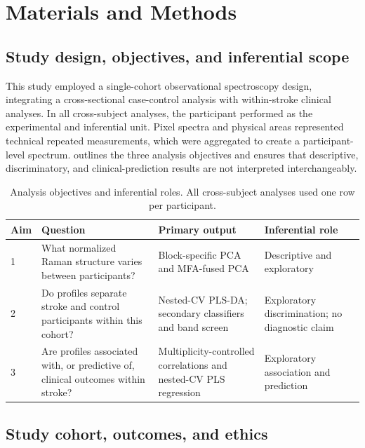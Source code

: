 \documentclass[preprint,12pt]{elsarticle}
\begin{document}
\section{Materials and Methods} 
\label{sec:methods}

\subsection{Study design, objectives, and inferential scope} \label{subsec:design}

This study employed a single-cohort observational spectroscopy design, integrating a cross-sectional case-control analysis with within-stroke clinical analyses. In all cross-subject analyses, the participant performed as the experimental and inferential unit. Pixel spectra and physical areas represented technical repeated measurements, which were aggregated to create a participant-level spectrum.  outlines the three analysis objectives and ensures that descriptive, discriminatory, and clinical-prediction results are not interpreted interchangeably.

\begin{table}[htbp] 
\centering 
\caption{Analysis objectives and inferential roles. All cross-subject analyses used one row per participant.} 
\label{tab:analysis_objectives} 
\small 
\begin{tabularx}{\textwidth}{@{}p{} >{\raggedright\arraybackslash}p{} >{\raggedright\arraybackslash}p{} >{\raggedright\arraybackslash}X@{}} 
\toprule 
Aim & Question & Primary output & Inferential role \\ 
\midrule 
1 & What normalized Raman structure varies between participants? & Block-specific PCA and MFA-fused PCA & Descriptive and exploratory \\ 
2 & Do profiles separate stroke and control participants within this cohort? & Nested-CV PLS-DA; secondary classifiers and band screen & Exploratory discrimination; no diagnostic claim \\
3 & Are profiles associated with, or predictive of, clinical outcomes within stroke? & Multiplicity-controlled correlations and nested-CV PLS regression & Exploratory association and prediction \\
\bottomrule 
\end{tabularx} 
\end{table}

\subsection{Study cohort, outcomes, and ethics} 
\label{subsec:cohort}
\end{document}
